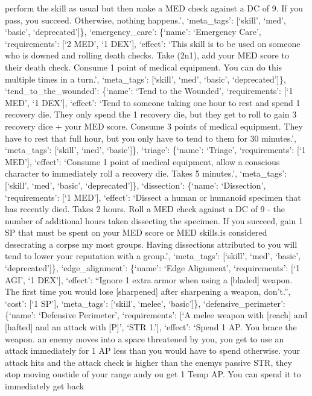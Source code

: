 \documentclass[
  letterpaper,
  DIV=11,
  numbers=noendperiod]{scrartcl}
\begin{document}
perform the skill as usual but then make a MED check against a DC of 9.
If you pass, you succeed. Otherwise, nothing happens.', `meta\_tags':
{[}`skill', `med', `basic', `deprecated'{]}\}, `emergency\_care':
\{`name': `Emergency Care', `requirements': {[}`2 MED', `1 DEX'{]},
`effect': `This skill is to be used on someone who is downed and rolling
death checks. Take (2n1), add your MED score to their death check.
Consume 1 point of medical equipment. You can do this multiple times in
a turn.', `meta\_tags': {[}`skill', `med', `basic', `deprecated'{]}\},
`tend\_to\_the\_wounded': \{`name': `Tend to the Wounded',
`requirements': {[}`1 MED', `1 DEX'{]}, `effect': `Tend to someone
taking one hour to rest and spend 1 recovery die. They only spend the 1
recovery die, but they get to roll to gain 3 recovery dice + your MED
score. Consume 3 points of medical equipment. They have to rest that
full hour, but you only have to tend to them for 30 minutes.',
`meta\_tags': {[}`skill', `med', `basic'{]}\}, `triage': \{`name':
`Triage', `requirements': {[}`1 MED'{]}, `effect': `Consume 1 point of
medical equipment, allow a conscious character to immediately roll a
recovery die. Takes 5 minutes.', `meta\_tags': {[}`skill', `med',
`basic', `deprecated'{]}\}, `dissection': \{`name': `Dissection',
`requirements': {[}`1 MED'{]}, `effect': `Dissect a human or humanoid
specimen that has recently died. Takes 2 hours. Roll a MED check against
a DC of 9 - the number of additional hours taken dissecting the
specimen. If you succeed, gain 1 SP that must be spent on your MED score
or MED skills.\nThis is considered desecrating a corpse my most groups.
Having dissections attributed to you will tend to lower your reputation
with a group.', `meta\_tags': {[}`skill', `med', `basic',
`deprecated'{]}\}, `edge\_alignment': \{`name': `Edge Alignment',
`requirements': {[}`1 AGI', `1 DEX'{]}, `effect': ``Ignore 1 extra armor
when using a {[}bladed{]} weapon. The first time you would lose
{[}sharpened{]} after sharpening a weapon, don't.'', `cost': {[}`1
SP'{]}, `meta\_tags': {[}`skill', `melee', `basic'{]}\},
`defensive\_perimeter': \{`name': `Defensive Perimeter', `requirements':
{[}`A melee weapon with {[}reach{]} and {[}hafted{]} and an attack with
{[}P{]}', `STR 1.'{]}, `effect': `Spend 1 AP. You brace the weapon.
\nIf an enemy moves into a space threatened by you, you get to use an
attack immediately for 1 AP less than you would have to spend otherwise.
\nIf your attack hits and the attack check is higher than the
enemy\textquotesingle s passive STR, they stop moving oustide of your
range andy ou get 1 Temp AP. You can spend it to immediately get back
\end{document}
